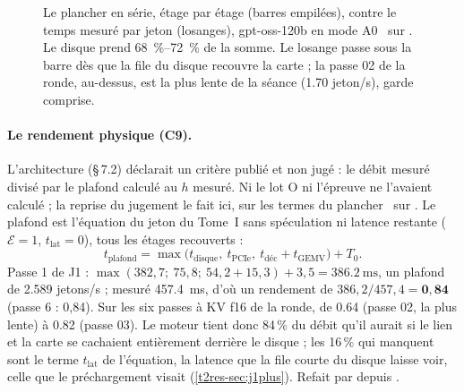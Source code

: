 \begin{figure}[ht]
\centering
\GrapheResPlancher
\caption[Le plancher en série, étage par étage]{Le plancher en série, étage par étage (barres empilées), contre le temps mesuré par jeton (losanges), gpt-oss-120b en mode A0 \calc~sur \mes. Le disque prend \SIrange{68}{72}{\percent} de la somme. Le losange passe sous la barre dès que la file du disque recouvre la carte ; la passe 02 de la ronde, au-dessus, est la plus lente de la séance (\num{1.70} jeton/s), garde comprise.}
\label{t2res-fig:plancher}
\end{figure}

\paragraph{Le rendement physique (C9).}\label{t2res-sec:c9} L'architecture (§\,7.2) déclarait un critère publié et non jugé : le débit mesuré divisé par le plafond calculé au $h$ mesuré. Ni le lot O ni l'épreuve ne l'avaient calculé ; la reprise du jugement le fait ici, sur les termes du plancher \calc~sur \mes. Le plafond est l'équation du jeton du Tome~I sans spéculation ni latence restante ($\mathcal E = 1$, $t_{\text{lat}} = 0$), tous les étages recouverts :
\[
t_{\text{plafond}} = \max\big(t_{\text{disque}},\ t_{\text{PCIe}},\ t_{\text{déc}} + t_{\text{GEMV}}\big) + T_0 .
\]
Passe 1 de J1 : $\max(382{,}7 ;\ 75{,}8 ;\ 54{,}2 + 15{,}3) + 3{,}5 = \SI{386.2}{\milli\second}$, un plafond de \num{2.589} jetons/s ; mesuré \SI{457.4}{\milli\second}, d'où un rendement de $386{,}2 / 457{,}4 = \mathbf{0{,}84}$ (passe 6 : 0,84). Sur les six passes à KV f16 de la ronde, de \num{0.64} (passe 02, la plus lente) à \num{0.82} (passe 03). Le moteur tient donc 84\,\% du débit qu'il aurait si le lien et la carte se cachaient entièrement derrière le disque ; les 16\,\% qui manquent sont le terme $t_{\text{lat}}$ de l'équation, la latence que la file courte du disque laisse voir, celle que le préchargement visait (\cref{t2res-sec:j1plus}). Refait par  depuis .

